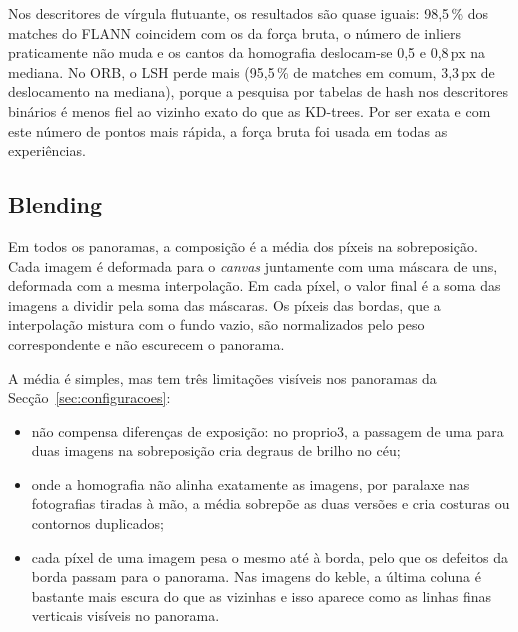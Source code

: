 \documentclass[11pt,a4paper]{article}
\newcommand{\px}{\,px}
\begin{document}
Nos descritores de vírgula flutuante, os resultados são quase iguais: 98,5\,\% dos matches do FLANN coincidem com os da força bruta, o número de inliers praticamente não muda e os cantos da homografia deslocam-se 0,5 e 0,8\px{} na mediana. No ORB, o LSH perde mais (95,5\,\% de matches em comum, 3,3\px{} de deslocamento na mediana), porque a pesquisa por tabelas de hash nos descritores binários é menos fiel ao vizinho exato do que as KD-trees. Por ser exata e com este número de pontos mais rápida, a força bruta foi usada em todas as experiências.


\subsection{Blending}
\label{sec:blending}

Em todos os panoramas, a composição é a média dos píxeis na sobreposição. Cada imagem é deformada para o \textit{canvas} juntamente com uma máscara de uns, deformada com a mesma interpolação. Em cada píxel, o valor final é a soma das imagens a dividir pela soma das máscaras. Os píxeis das bordas, que a interpolação mistura com o fundo vazio, são normalizados pelo peso correspondente e não escurecem o panorama.

A média é simples, mas tem três limitações visíveis nos panoramas da Secção~\ref{sec:configuracoes}:
\begin{itemize}
  \item não compensa diferenças de exposição: no proprio3, a passagem de uma para duas imagens na sobreposição cria degraus de brilho no céu;
  \item onde a homografia não alinha exatamente as imagens, por paralaxe nas fotografias tiradas à mão, a média sobrepõe as duas versões e cria costuras ou contornos duplicados;
  \item cada píxel de uma imagem pesa o mesmo até à borda, pelo que os defeitos da borda passam para o panorama. Nas imagens do keble, a última coluna é bastante mais escura do que as vizinhas e isso aparece como as linhas finas verticais visíveis no panorama.
\end{itemize}

\end{document}

